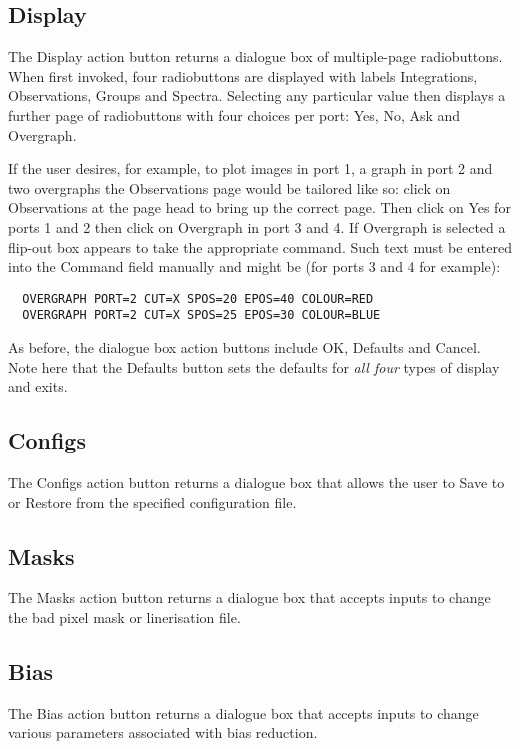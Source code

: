 \documentclass[a4paper]{book}
\renewcommand{\_}{{\tt\char'137}}
\begin{document}
\subsection{Display}
The {\sf Display} action button returns a dialogue box of
multiple-page radiobuttons. When first invoked, four radiobuttons are displayed with labels
{\sf Integrations}, {\sf Observations}, {\sf Groups} and {\sf Spectra}. Selecting any particular
value then displays a further page of radiobuttons with four choices per port: {\sf Yes}, 
{\sf No}, {\sf Ask} and {\sf Overgraph}.

If the user desires, for example, to plot images in port 1, a graph in port 2 and two overgraphs the
{\sf Observations} page would be tailored like so: click on {\sf Observations} at the page head to 
bring up the correct page. Then click on {\sf Yes} for ports 1 and 2 then
click on {\sf Overgraph} in port 3 and 4. If {\sf Overgraph} is selected a flip-out box appears
to take the appropriate command. Such text must be entered into the {\sf Command} field
manually and might be (for ports 3 and 4 for example):

\begin{verbatim}
  OVERGRAPH PORT=2 CUT=X SPOS=20 EPOS=40 COLOUR=RED
  OVERGRAPH PORT=2 CUT=X SPOS=25 EPOS=30 COLOUR=BLUE
\end{verbatim}

As before, the dialogue box action buttons include {\sf OK}, {\sf Defaults} and {\sf Cancel}.
Note here that the {\sf Defaults} button sets the defaults for {\em all four} types of display
and exits.

\subsection{Configs}
The {\sf Configs} action button returns a dialogue box that
allows the user to {\sf Save} to or {\sf Restore} from the specified configuration
file. 

\subsection{Masks}
The {\sf Masks} action button returns a dialogue box that
accepts inputs to change the bad pixel mask or linerisation file.

\subsection{Bias}
The {\sf Bias} action button returns a dialogue box that
accepts inputs to change various parameters associated with {\sc bias} reduction.
\end{document}
